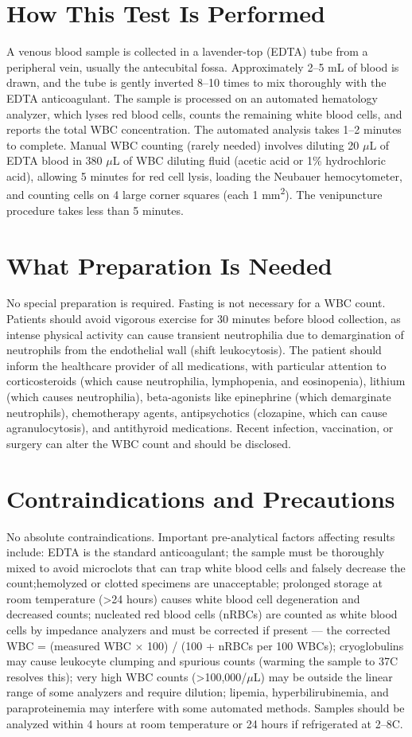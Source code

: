 \section*{How This Test Is Performed}
A venous blood sample is collected in a lavender-top (EDTA) tube from a peripheral vein, usually the antecubital fossa. Approximately 2--5 mL of blood is drawn, and the tube is gently inverted 8--10 times to mix thoroughly with the EDTA anticoagulant. The sample is processed on an automated hematology analyzer, which lyses red blood cells, counts the remaining white blood cells, and reports the total WBC concentration. The automated analysis takes 1--2 minutes to complete. Manual WBC counting (rarely needed) involves diluting 20 $\mu$L of EDTA blood in 380 $\mu$L of WBC diluting fluid (acetic acid or 1\% hydrochloric acid), allowing 5 minutes for red cell lysis, loading the Neubauer hemocytometer, and counting cells on 4 large corner squares (each 1 mm\textsuperscript{2}). The venipuncture procedure takes less than 5 minutes.

\section*{What Preparation Is Needed}
No special preparation is required. Fasting is not necessary for a WBC count. Patients should avoid vigorous exercise for 30 minutes before blood collection, as intense physical activity can cause transient neutrophilia due to demargination of neutrophils from the endothelial wall (shift leukocytosis). The patient should inform the healthcare provider of all medications, with particular attention to corticosteroids (which cause neutrophilia, lymphopenia, and eosinopenia), lithium (which causes neutrophilia), beta-agonists like epinephrine (which demarginate neutrophils), chemotherapy agents, antipsychotics (clozapine, which can cause agranulocytosis), and antithyroid medications. Recent infection, vaccination, or surgery can alter the WBC count and should be disclosed.

\section*{Contraindications and Precautions}
No absolute contraindications. Important pre-analytical factors affecting results include: EDTA is the standard anticoagulant; the sample must be thoroughly mixed to avoid microclots that can trap white blood cells and falsely decrease the count;hemolyzed or clotted specimens are unacceptable; prolonged storage at room temperature (>24 hours) causes white blood cell degeneration and decreased counts; nucleated red blood cells (nRBCs) are counted as white blood cells by impedance analyzers and must be corrected if present --- the corrected WBC = (measured WBC $\times$ 100) / (100 + nRBCs per 100 WBCs); cryoglobulins may cause leukocyte clumping and spurious counts (warming the sample to 37\textdegree{}C resolves this); very high WBC counts (>100,000/$\mu$L) may be outside the linear range of some analyzers and require dilution; lipemia, hyperbilirubinemia, and paraproteinemia may interfere with some automated methods. Samples should be analyzed within 4 hours at room temperature or 24 hours if refrigerated at 2--8\textdegree{}C.


